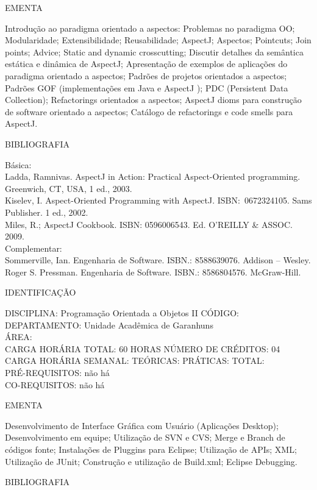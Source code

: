 \documentclass[
	12pt,				%
	openright,			%
  oneside,     %
	a4paper,			%
	chapter=TITLE,		%
	english,			%
	french,				%
	spanish,			%
	brazil				%
	]{abntex2}
\begin{document}
\begin{apendicesenv}
EMENTA 

Introdução ao paradigma orientado a aspectos: Problemas no paradigma OO; Modularidade; Extensibilidade; Reusabilidade; AspectJ; Aspectos; Pointcuts; Join points; Advice; Static and dynamic crosscutting; Discutir detalhes da semântica estática e dinâmica de AspectJ; Apresentação de exemplos de aplicações do paradigma orientado a aspectos; Padrões de projetos orientados a aspectos; Padrões GOF (implementações em Java e AspectJ ); PDC (Persistent Data Collection); Refactorings orientados a aspectos; AspectJ dioms para construção de software orientado a aspectos; Catálogo de refactorings e code smells para AspectJ.

BIBLIOGRAFIA 

Básica:\\
Ladda, Ramnivas. AspectJ in Action: Practical Aspect-Oriented
programming. Greenwich, CT, USA, 1 ed., 2003.\\
Kiselev, I. Aspect-Oriented Programming with AspectJ. ISBN:~0672324105.
Sams Publisher. 1 ed., 2002.\\
Miles, R.; AspectJ Cookbook. ISBN: 0596006543. Ed. O'REILLY \& ASSOC.
2009.\\
Complementar:\\
Sommerville, Ian. Engenharia de Software. ISBN.: 8588639076. Addison --
Wesley.\\
Roger S. Pressman. Engenharia de Software. ISBN.: 8586804576.
McGraw-Hill.\

\newpage IDENTIFICAÇÃO

DISCIPLINA: Programação Orientada a Objetos II CÓDIGO:\\ 
DEPARTAMENTO: Unidade Acadêmica de Garanhuns\\ 
ÁREA: \\
CARGA HORÁRIA TOTAL: 60 HORAS NÚMERO DE CRÉDITOS: 04\\
CARGA HORÁRIA SEMANAL: TEÓRICAS: PRÁTICAS: TOTAL: \\
PRÉ-REQUISITOS: não há\\
CO-REQUISITOS: não há

EMENTA 

Desenvolvimento de Interface Gráfica com Usuário (Aplicações Desktop); Desenvolvimento em equipe; Utilização de SVN e CVS; Merge e Branch de códigos fonte; Instalações de Pluggins para Eclipse; Utilização de APIs; XML; Utilização de JUnit; Construção e utilização de Build.xml; Eclipse Debugging.

BIBLIOGRAFIA 


\end{apendicesenv}
\end{document}
